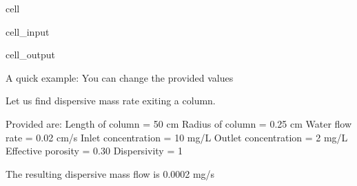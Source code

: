 \documentclass[letterpaper,10pt,english]{jupyterBook}
\begin{document}
\begin{sphinxuseclass}{cell}
\begin{sphinxVerbatimInput}
\begin{sphinxuseclass}{cell_input}
\begin{sphinxVerbatim}[commandchars=\\\{\}]
     

\end{sphinxVerbatim}

\end{sphinxuseclass}\end{sphinxVerbatimInput}
\begin{sphinxVerbatimOutput}

\begin{sphinxuseclass}{cell_output}
\begin{sphinxVerbatim}[commandchars=\\\{\}]
A quick example: You can change the provided values

Let us find dispersive mass rate exiting a column.

Provided are:
Length of column = 50 cm
Radius of column = 0.25 cm
Water flow rate = 0.02 cm/s
Inlet concentration = 10 mg/L
Outlet concentration = 2 mg/L 
Effective porosity = 0.30
Dispersivity = 1 

The resulting dispersive mass flow is 0.0002 mg/s
\end{sphinxVerbatim}

\end{sphinxuseclass}\end{sphinxVerbatimOutput}

\end{sphinxuseclass}
\end{document}
